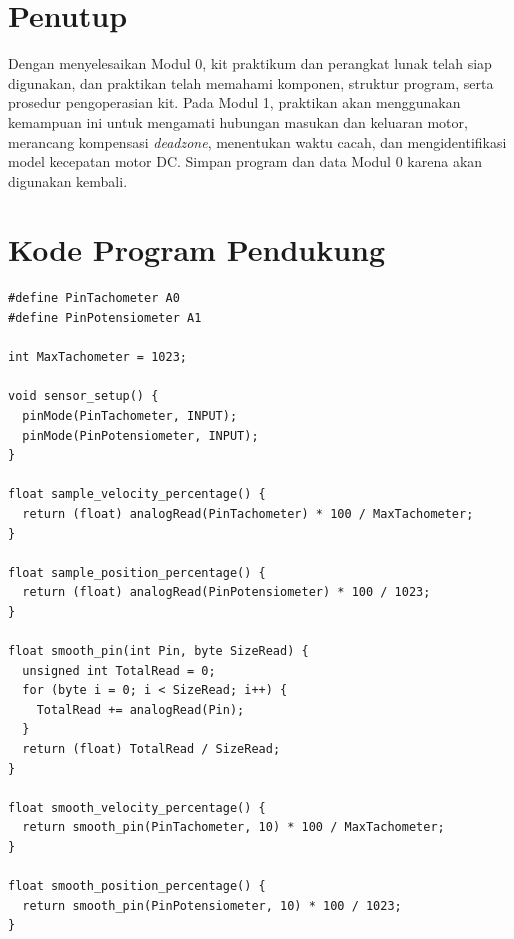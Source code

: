 \documentclass[11pt,a4paper]{article}
\begin{document}
\section{Penutup}
Dengan menyelesaikan Modul 0, kit praktikum dan perangkat lunak telah siap digunakan, dan praktikan telah memahami komponen, struktur program, serta prosedur pengoperasian kit. Pada Modul 1, praktikan akan menggunakan kemampuan ini untuk mengamati hubungan masukan dan keluaran motor, merancang kompensasi \textit{deadzone}, menentukan waktu cacah, dan mengidentifikasi model kecepatan motor DC. Simpan program dan data Modul 0 karena akan digunakan kembali.

\appendix
\section{Kode Program Pendukung}
\label{lamp:kode}

\begin{lstlisting}[caption={Tab \texttt{1\_sensor.ino}},label={lst:sensor}]
#define PinTachometer A0
#define PinPotensiometer A1

int MaxTachometer = 1023;

void sensor_setup() {
  pinMode(PinTachometer, INPUT);
  pinMode(PinPotensiometer, INPUT);
}

float sample_velocity_percentage() {
  return (float) analogRead(PinTachometer) * 100 / MaxTachometer;
}

float sample_position_percentage() {
  return (float) analogRead(PinPotensiometer) * 100 / 1023;
}

float smooth_pin(int Pin, byte SizeRead) {
  unsigned int TotalRead = 0;
  for (byte i = 0; i < SizeRead; i++) {
    TotalRead += analogRead(Pin);
  }
  return (float) TotalRead / SizeRead;
}

float smooth_velocity_percentage() {
  return smooth_pin(PinTachometer, 10) * 100 / MaxTachometer;
}

float smooth_position_percentage() {
  return smooth_pin(PinPotensiometer, 10) * 100 / 1023;
}
\end{lstlisting}
\end{document}
